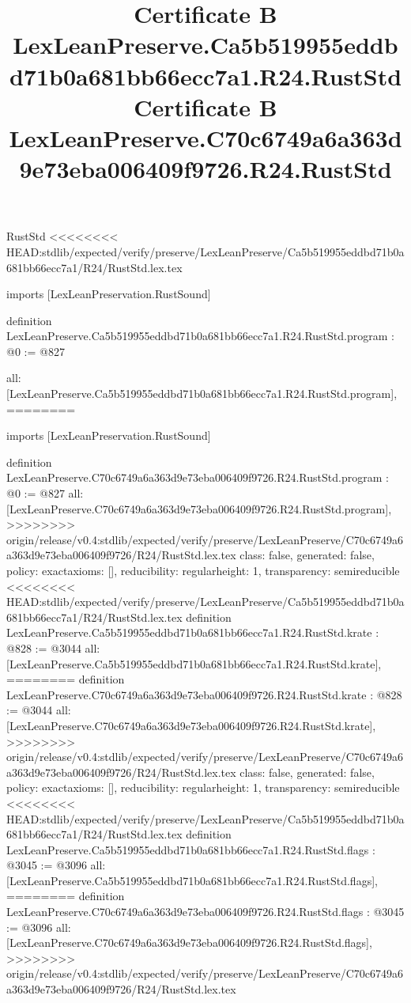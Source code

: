 \begin{lexlean}{RustStd}
<<<<<<<< HEAD:stdlib/expected/verify/preserve/LexLeanPreserve/Ca5b519955eddbd71b0a681bb66ecc7a1/R24/RustStd.lex.tex
\title{Certificate B LexLeanPreserve.Ca5b519955eddbd71b0a681bb66ecc7a1.R24.RustStd}
\begin{coremodule}
imports [LexLeanPreservation.RustSound]

definition LexLeanPreserve.Ca5b519955eddbd71b0a681bb66ecc7a1.R24.RustStd.program : @0 := @827 {
  all: [LexLeanPreserve.Ca5b519955eddbd71b0a681bb66ecc7a1.R24.RustStd.program],
========
\title{Certificate B LexLeanPreserve.C70c6749a6a363d9e73eba006409f9726.R24.RustStd}
\begin{coremodule}
imports [LexLeanPreservation.RustSound]

definition LexLeanPreserve.C70c6749a6a363d9e73eba006409f9726.R24.RustStd.program : @0 := @827 {
  all: [LexLeanPreserve.C70c6749a6a363d9e73eba006409f9726.R24.RustStd.program],
>>>>>>>> origin/release/v0.4:stdlib/expected/verify/preserve/LexLeanPreserve/C70c6749a6a363d9e73eba006409f9726/R24/RustStd.lex.tex
  class: false,
  generated: false,
  policy: exact{axioms: []},
  reducibility: regular{height: 1},
  transparency: semireducible
}
<<<<<<<< HEAD:stdlib/expected/verify/preserve/LexLeanPreserve/Ca5b519955eddbd71b0a681bb66ecc7a1/R24/RustStd.lex.tex
definition LexLeanPreserve.Ca5b519955eddbd71b0a681bb66ecc7a1.R24.RustStd.krate : @828 := @3044 {
  all: [LexLeanPreserve.Ca5b519955eddbd71b0a681bb66ecc7a1.R24.RustStd.krate],
========
definition LexLeanPreserve.C70c6749a6a363d9e73eba006409f9726.R24.RustStd.krate : @828 := @3044 {
  all: [LexLeanPreserve.C70c6749a6a363d9e73eba006409f9726.R24.RustStd.krate],
>>>>>>>> origin/release/v0.4:stdlib/expected/verify/preserve/LexLeanPreserve/C70c6749a6a363d9e73eba006409f9726/R24/RustStd.lex.tex
  class: false,
  generated: false,
  policy: exact{axioms: []},
  reducibility: regular{height: 1},
  transparency: semireducible
}
<<<<<<<< HEAD:stdlib/expected/verify/preserve/LexLeanPreserve/Ca5b519955eddbd71b0a681bb66ecc7a1/R24/RustStd.lex.tex
definition LexLeanPreserve.Ca5b519955eddbd71b0a681bb66ecc7a1.R24.RustStd.flags : @3045 := @3096 {
  all: [LexLeanPreserve.Ca5b519955eddbd71b0a681bb66ecc7a1.R24.RustStd.flags],
========
definition LexLeanPreserve.C70c6749a6a363d9e73eba006409f9726.R24.RustStd.flags : @3045 := @3096 {
  all: [LexLeanPreserve.C70c6749a6a363d9e73eba006409f9726.R24.RustStd.flags],
>>>>>>>> origin/release/v0.4:stdlib/expected/verify/preserve/LexLeanPreserve/C70c6749a6a363d9e73eba006409f9726/R24/RustStd.lex.tex
}}}
\end{coremodule}}
\end{coremodule}
\end{lexlean}
